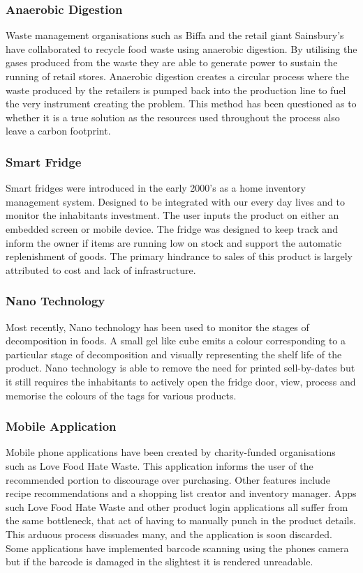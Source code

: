 \documentclass[a4paper, 11pt]{article}
\begin{document}
\subsubsection{Anaerobic Digestion} 
Waste management organisations such as Biffa and the retail giant Sainsbury's have collaborated to recycle food waste using anaerobic digestion. By utilising the gases produced from the waste they are able to generate power to sustain the running of retail stores. Anaerobic digestion creates a circular process where the waste produced by the retailers is pumped back into the production line to fuel the very instrument creating the problem. This method has been questioned as to whether it is a true solution as the resources used throughout the process also leave a carbon footprint.

\subsubsection{Smart Fridge} Smart fridges were introduced in the early 2000's as a home inventory management system. Designed to be integrated with our every day lives and to monitor the inhabitants investment. The user inputs the product on either an embedded screen or mobile device. The fridge was designed to keep track and inform the owner if items are running low on stock and support the automatic replenishment of goods. The primary hindrance to sales of this product is largely attributed to cost and lack of infrastructure. 

\subsubsection{Nano Technology} 
Most recently, Nano technology has been used to monitor the stages of decomposition in foods. A small gel like cube emits a colour corresponding to a particular stage of decomposition and visually representing the shelf life of the product. Nano technology is able to remove the need for printed sell-by-dates but it still requires the inhabitants to actively open the fridge door, view, process and memorise the colours of the tags for various products. 

\subsubsection{Mobile Application} 
Mobile phone applications have been created by charity-funded organisations such as Love Food Hate Waste. This application informs the user of the recommended portion to discourage over purchasing. Other features include recipe recommendations and a shopping list creator and inventory manager. 
Apps such Love Food Hate Waste and other product login applications all suffer from the same bottleneck, that act of having to manually punch in the product details. This arduous process dissuades many, and the application is soon discarded. Some applications have implemented barcode scanning using the phones camera but if the barcode is damaged in the slightest it is rendered unreadable. 
\end{document}
